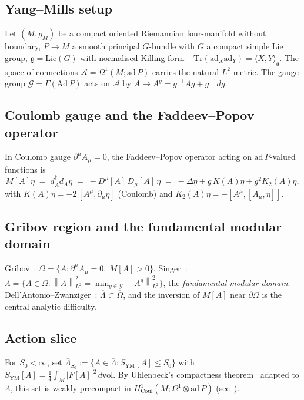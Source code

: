 \documentclass[11pt,a4paper]{amsart}
\theoremstyle{definition}
\newcommand{\gfrak}{\mathfrak{g}}
\newcommand{\norm}[1]{\left\lVert#1\right\rVert}
\newcommand{\abs}[1]{\left\lvert#1\right\rvert}
\newcommand{\Tr}{\mathrm{Tr}}
\newcommand{\ad}{\mathrm{ad}}
\newcommand{\Coul}{\mathrm{Coul}}
\newcommand{\dvol}{\, d\mathrm{vol}}
\begin{document}
\subsection{Yang--Mills setup}
Let $(M, g_M)$ be a compact oriented Riemannian four-manifold without
boundary, $P \to M$ a smooth principal $G$-bundle with $G$ a compact simple
Lie group, $\gfrak = \mathrm{Lie}(G)$ with normalised Killing form
$-\Tr(\ad_X\ad_Y) = \langle X, Y\rangle_\gfrak$. The space of connections
$\mathcal A = \Omega^1(M;\mathrm{ad}\,P)$ carries the natural $L^2$
metric. The gauge group $\mathcal G = \Gamma(\mathrm{Ad}\,P)$ acts on
$\mathcal A$ by $A \mapsto A^g = g^{-1}Ag + g^{-1}dg$.

\subsection{Coulomb gauge and the Faddeev--Popov operator}
In Coulomb gauge $\partial^\mu A_\mu = 0$, the Faddeev--Popov operator
acting on $\mathrm{ad}\,P$-valued functions is
$$
M[A]\eta \;=\; d_A^\dagger d_A \eta \;=\; -D^\mu[A]\,D_\mu[A]\,\eta
\;=\; -\Delta\eta + g\,K(A)\eta + g^2 K_2(A)\eta,
$$
with $K(A)\eta = -2\,[A^\mu,\partial_\mu\eta]$ (Coulomb) and
$K_2(A)\eta = -[A^\mu,[A_\mu,\eta]]$.

\subsection{Gribov region and the fundamental modular domain}
Gribov~\cite{Gribov1978}:
$\Omega = \{A : \partial^\mu A_\mu = 0,\ M[A] > 0\}$.
Singer~\cite{Singer1978}:
$\Lambda = \{A \in \Omega : \norm{A}_{L^2}^2 = \min_{g\in\mathcal G}
\norm{A^g}_{L^2}^2\}$, the \emph{fundamental modular domain}.
Dell'Antonio--Zwanziger~\cite{DellAntonioZwanziger1991}:
$\overline{\Lambda}\subset\overline{\Omega}$, and the inversion of $M[A]$
near $\partial\Omega$ is the central analytic difficulty.

\subsection{Action slice}
For $S_0 < \infty$, set
$\overline{\Lambda}_{S_0} := \{A \in \overline{\Lambda} : S_\mathrm{YM}[A]
\leq S_0\}$ with $S_\mathrm{YM}[A] = \tfrac14 \int_M \abs{F[A]}^2\dvol$.
By Uhlenbeck's compactness theorem~\cite{Uhlenbeck1982} adapted to
$\overline{\Lambda}$, this set is weakly precompact in
$H^1_{\Coul}(M; \Omega^1\otimes\mathrm{ad}\,P)$
(see~\cite[Lemma~5.1 of the companion]{RemondiereKRFP3_2026}).
\end{document}
